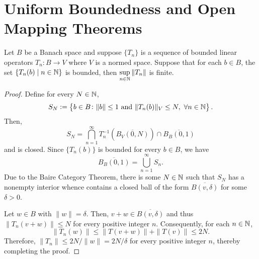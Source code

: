 \begin{definition}[Seminorm]
    
\end{definition}

\section{Uniform Boundedness and Open Mapping Theorems}

\begin{theorem}
    Let $B$ be a Banach space and suppose $\{T_n\}$ is a sequence of bounded linear operators $T_n: B\to V$ where $V$ is a normed space. Suppose that for each $b\in B$, the set $\{T_n(b)\mid n\in\mathbb{N}\}$ is bounded, then $\sup\limits_{n\in\mathbb{N}}\|T_n\|$ is finite.
\end{theorem}
\begin{proof}
    Define for every $N\in\mathbb{N}$,
    \begin{equation*}
        S_N := \left\{b\in B\colon \|b\|\le 1~\text{and}~\|T_n(b)\|_V\le N,~\forall n\in\mathbb{N}\right\}.
    \end{equation*}
    Then, 
    \begin{equation*}
        S_N = \bigcap_{n = 1}^\infty T_n^{-1}(\overline{B_V(0,N)})\cap\overline{B_B(0,1)}
    \end{equation*}
    and is closed. Since $\{T_n(b)\}$ is bounded for every $b\in B$, we have 
    \begin{equation*}
        \overline{B_B(0,1)} = \bigcup_{n = 1}^\infty S_n.
    \end{equation*}
    Due to the Baire Category Theorem, there is some $N\in\mathbb{N}$ such that $S_N$ has a nonempty interior whence contains a closed ball of the form $\overline{B(v,\delta)}$ for some $\delta > 0$.

    Let $w\in B$ with $\|w\| = \delta$. Then, $v + w\in\overline{B(v,\delta)}$ and thus $\|T_n(v + w)\|\le N$ for every positive integer $n$. Consequently, for each $n\in\mathbb{N}$,
    \begin{equation*}
        \|T_n(w)\|\le\|T(v + w)\| + \|T(v)\|\le 2N.
    \end{equation*}
    Therefore, $\|T_n\|\le 2N/\|w\| = 2N/\delta$ for every positive integer $n$, thereby completing the proof.
\end{proof}


